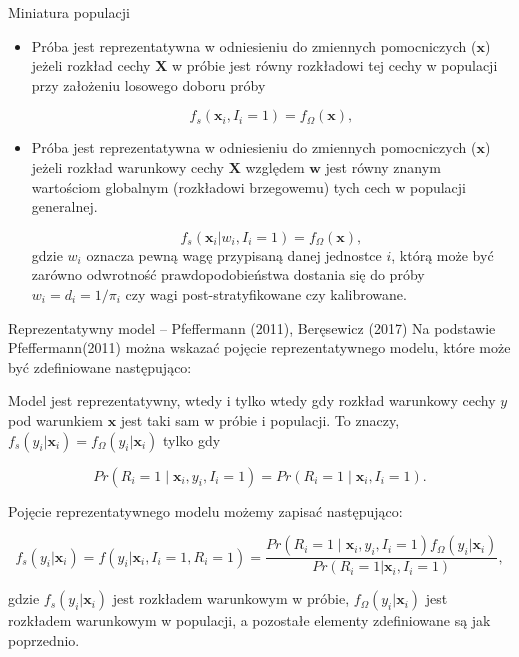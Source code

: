 \documentclass[10pt,ignorenonframetext, aspectratio=169]{beamer}
\newcommand{\bX}{\boldsymbol{X}}
\newcommand{\bx}{\boldsymbol{x}}
\newcommand{\bw}{\boldsymbol{w}}
\begin{document}
\begin{frame}{Miniatura populacji}
    \begin{itemize}
        \item Próba jest reprezentatywna w odniesieniu do zmiennych pomocniczych ($\bx$) jeżeli rozkład cechy $\bX$ w próbie jest równy rozkładowi tej cechy w populacji przy założeniu losowego doboru próby
        
        \begin{equation}
            f_s(\bx_i, I_{i} = 1) = f_{\Omega}(\bx),    \label{definition-betlehem}
        \end{equation}
        
    \item Próba jest reprezentatywna w odniesieniu do zmiennych pomocniczych ($\bx$) jeżeli rozkład warunkowy cechy $\bX$ względem $\bw$ jest równy znanym wartościom globalnym (rozkładowi brzegowemu) tych cech w populacji generalnej.

    \begin{equation}
        f_s(\bx_i | w_i, I_{i} = 1) = f_{\Omega}(\bx),
    \label{definition-betlehem2}
    \end{equation}
    gdzie $w_i$ oznacza pewną wagę przypisaną danej jednostce $i$, którą może być zarówno odwrotność prawdopodobieństwa dostania się do próby $w_i = d_i = 1 / \pi_i$ czy wagi post-stratyfikowane czy kalibrowane.

    \end{itemize}
\end{frame}

\begin{frame}{Reprezentatywny model -- Pfeffermann (2011), Beręsewicz (2017)} 
    Na podstawie Pfeffermann(2011) można wskazać pojęcie reprezentatywnego modelu, które może być zdefiniowane następująco:

Model jest reprezentatywny, wtedy i tylko wtedy gdy rozkład warunkowy cechy $y$ pod warunkiem $\bx$ jest taki sam w próbie i populacji. To znaczy, $f_{s}(y_i | \bx_i) =  f_{\Omega}(y_i | \bx_i)$ tylko gdy

\begin{equation}
    Pr(R_i = 1 \mid \bx_i, y_i, I_i = 1)  = Pr(R_i = 1 \mid  \bx_i, I_i = 1).
\label{pfeffermann-equality}
\end{equation}

Pojęcie reprezentatywnego modelu możemy zapisać następująco:

\begin{equation}
    f_{s}(y_i | \bx_i) ={}  
f(y_i | \bx_i, I_i = 1, R_i=1) =  
\frac{Pr(R_i=1 \mid \bx_i, y_{i}, I_i=1)f_{\Omega}(y_i | \bx_i)}{Pr(R_i = 1 | \bx_i, I_i = 1)},
\label{def-pfefferman-modelling}
\end{equation}

gdzie $f_{s}(y_i | \bx_i)$ jest rozkładem warunkowym w próbie, $f_{\Omega}(y_i | \bx_i)$ jest rozkładem warunkowym w populacji, a pozostałe elementy zdefiniowane są jak poprzednio.
\end{frame}
\end{document}
